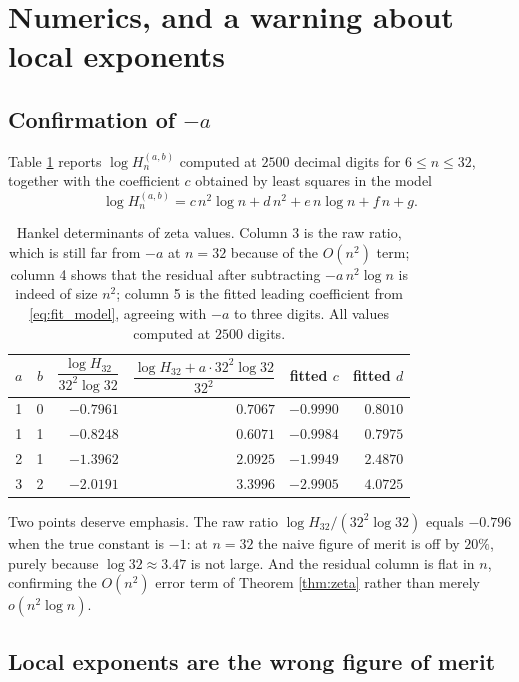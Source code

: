 \documentclass[11pt]{amsart}
\numberwithin{equation}{section}
\theoremstyle{plain}
\theoremstyle{definition}
\theoremstyle{remark}
\begin{document}
\section{Numerics, and a warning about local exponents}
\label{sec:numerics}

\subsection{Confirmation of $-a$}

Table \ref{tab:zeta} reports $\log H_{n}^{(a,b)}$ computed at $2500$ decimal digits for
$6\le n\le32$, together with the coefficient $c$ obtained by least squares in the model
\begin{equation}
\log H_{n}^{(a,b)}=c\,n^{2}\log n+d\,n^{2}+e\,n\log n+f\,n+g .
\label{eq:fit_model}
\end{equation}

\begin{table}[htbp]
\centering
\begin{tabular}{ccrrrr}
\toprule
$a$ & $b$ & $\dfrac{\log H_{32}}{32^{2}\log32}$ & $\dfrac{\log H_{32}+a\cdot32^{2}\log32}{32^{2}}$ & fitted $c$ & fitted $d$\\
\midrule
1 & 0 & $-0.7961$ & $0.7067$ & $-0.9990$ & $0.8010$\\
1 & 1 & $-0.8248$ & $0.6071$ & $-0.9984$ & $0.7975$\\
2 & 1 & $-1.3962$ & $2.0925$ & $-1.9949$ & $2.4870$\\
3 & 2 & $-2.0191$ & $3.3996$ & $-2.9905$ & $4.0725$\\
\bottomrule
\end{tabular}
\caption{Hankel determinants of zeta values. Column 3 is the raw ratio, which is
still far from $-a$ at $n=32$ because of the $O(n^{2})$ term; column 4 shows that the residual
after subtracting $-a\,n^{2}\log n$ is indeed of size $n^{2}$; column 5 is the fitted leading
coefficient from \eqref{eq:fit_model}, agreeing with $-a$ to three digits. All values computed at
$2500$ digits.}
\label{tab:zeta}
\end{table}

Two points deserve emphasis. The raw ratio $\log H_{32}/(32^{2}\log32)$ equals $-0.796$ when the
true constant is $-1$: at $n=32$ the naive figure of merit is off by $20\%$, purely because
$\log32\approx3.47$ is not large. And the residual column is flat in $n$, confirming the $O(n^{2})$
error term of Theorem \ref{thm:zeta} rather than merely $o(n^{2}\log n)$.

\subsection{Local exponents are the wrong figure of merit}
\end{document}
